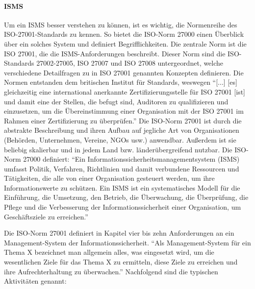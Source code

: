 \paragraph{\ac{ISMS}}\label{kap:ISMS}
Um ein \ac{ISMS} besser verstehen zu können, ist es wichtig, die Normenreihe des ISO-27001-Standards zu kennen. So bietet die ISO-Norm 27000 einen Überblick über ein solches System und definiert Begrifflichkeiten. Die zentrale Norm ist die ISO 27001, die die \ac{ISMS}-Anforderungen beschreibt.\autocite[vgl.][]{dindeutsches_institut_fur_normung_informationstechnik_2020} Dieser Norm sind die ISO-Standards 27002-27005, ISO 27007 und ISO 27008 untergeordnet, welche verschiedene Detailfragen zu in ISO 27001 genannten Konzepten definieren. Die Normen entstanden dem britischen Institut für Standards, weswegen \enquote{[...] [es] gleichzeitig eine international anerkannte Zertifizierungsstelle für ISO 27001 [ist] und damit eine der Stellen, die befugt sind, Auditoren zu qualifizieren und einzusetzen, um die Übereinstimmung einer Organisation mit der ISO 27001 im Rahmen einer Zertifizierung zu überprüfen.}\autocite[vgl.][S.\,2]{kersten_it-sicherheitsmanagement_2020} Die ISO-Norm 27001 ist durch die abstrakte Beschreibung und ihren Aufbau auf jegliche Art von Organisationen (Behörden, Unternehmen, Vereine, \ac{NGOs} usw.) anwendbar. Außerdem ist sie beliebig skalierbar und in jedem Land bzw. länderübergreifend nutzbar.\autocite[vgl.][S.\,4]{kersten_it-sicherheitsmanagement_2020} Die ISO-Norm 27000 definiert: \enquote{Ein Informationssicherheitsmanagementsystem (ISMS) umfasst Politik, Verfahren, Richtlinien und damit verbundene Ressourcen und Tätigkeiten,   die alle von einer Organisation gesteuert werden, um ihre Informationswerte zu  schützen. Ein ISMS ist ein systematisches Modell für die Einführung, die Umsetzung,  den Betrieb, die Überwachung, die Überprüfung, die Pflege und die Verbesserung der Informationssicherheit einer Organisation, um Geschäftsziele zu erreichen.}\autocite[][S.\,20]{dindeutsches_institut_fur_normung_informationstechnik_2019}
\par
Die ISO-Norm 27001 definiert in Kapitel vier bis zehn Anforderungen an ein Management-System der Informationssicherheit.\autocite[vgl.][S.\,6-16]{dindeutsches_institut_fur_normung_informationstechnik_2020} \enquote{Als Management-System für ein Thema X bezeichnet man allgemein alles, was eingesetzt wird, um die wesentlichen Ziele für das Thema X zu ermitteln, diese Ziele zu erreichen und ihre Aufrechterhaltung zu überwachen.}\autocite[][S.\,5]{kersten_it-sicherheitsmanagement_2020} Nachfolgend sind die typischen Aktivitäten genannt\autocite[][S.\,5]{kersten_it-sicherheitsmanagement_2020}:
